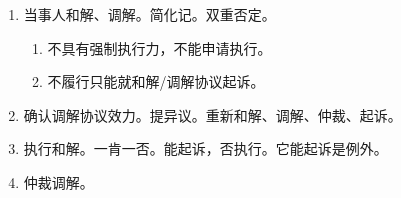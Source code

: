\begin{enumerate}
\begin{enumerate}
                \begin{enumerate}
                  \item 不可以就调解协议起诉 \yjt 纠纷已实体处理，重复起诉。
                  \item 有强制执行力，可以申请执行。
                  \item 二审、再审的调解多一个一审判决视为撤销的功能。
                \end{enumerate}
          \item 当事人和解、调解。简化记。双重否定。
                \begin{enumerate}
                  \item 不具有强制执行力，不能申请执行。
                  \item 不履行只能就和解/调解协议起诉。
                \end{enumerate}
          \item 确认调解协议效力。\yi 提异议。\er 重新和解、调解、仲裁、起诉。
          \item 执行和解。一肯一否。能起诉，否执行。它能起诉是例外。
          \item 仲裁调解。
        \end{enumerate}
\end{enumerate}

